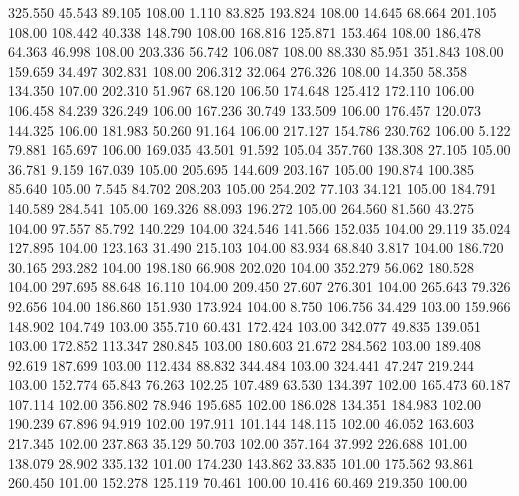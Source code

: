 325.550   45.543   89.105       108.00
   1.110   83.825  193.824       108.00
  14.645   68.664  201.105       108.00
 108.442   40.338  148.790       108.00
 168.816  125.871  153.464       108.00
 186.478   64.363   46.998       108.00
 203.336   56.742  106.087       108.00
  88.330   85.951  351.843       108.00
 159.659   34.497  302.831       108.00
 206.312   32.064  276.326       108.00
  14.350   58.358  134.350       107.00
 202.310   51.967   68.120       106.50
 174.648  125.412  172.110       106.00
 106.458   84.239  326.249       106.00
 167.236   30.749  133.509       106.00
 176.457  120.073  144.325       106.00
 181.983   50.260   91.164       106.00
 217.127  154.786  230.762       106.00
   5.122   79.881  165.697       106.00
 169.035   43.501   91.592       105.04
 357.760  138.308   27.105       105.00
  36.781    9.159  167.039       105.00
 205.695  144.609  203.167       105.00
 190.874  100.385   85.640       105.00
   7.545   84.702  208.203       105.00
 254.202   77.103   34.121       105.00
 184.791  140.589  284.541       105.00
 169.326   88.093  196.272       105.00
 264.560   81.560   43.275       104.00
  97.557   85.792  140.229       104.00
 324.546  141.566  152.035       104.00
  29.119   35.024  127.895       104.00
 123.163   31.490  215.103       104.00
  83.934   68.840    3.817       104.00
 186.720   30.165  293.282       104.00
 198.180   66.908  202.020       104.00
 352.279   56.062  180.528       104.00
 297.695   88.648   16.110       104.00
 209.450   27.607  276.301       104.00
 265.643   79.326   92.656       104.00
 186.860  151.930  173.924       104.00
   8.750  106.756   34.429       103.00
 159.966  148.902  104.749       103.00
 355.710   60.431  172.424       103.00
 342.077   49.835  139.051       103.00
 172.852  113.347  280.845       103.00
 180.603   21.672  284.562       103.00
 189.408   92.619  187.699       103.00
 112.434   88.832  344.484       103.00
 324.441   47.247  219.244       103.00
 152.774   65.843   76.263       102.25
 107.489   63.530  134.397       102.00
 165.473   60.187  107.114       102.00
 356.802   78.946  195.685       102.00
 186.028  134.351  184.983       102.00
 190.239   67.896   94.919       102.00
 197.911  101.144  148.115       102.00
  46.052  163.603  217.345       102.00
 237.863   35.129   50.703       102.00
 357.164   37.992  226.688       101.00
 138.079   28.902  335.132       101.00
 174.230  143.862   33.835       101.00
 175.562   93.861  260.450       101.00
 152.278  125.119   70.461       100.00
  10.416   60.469  219.350       100.00
